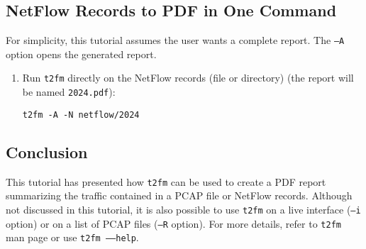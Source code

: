 \documentclass[documentation]{subfiles}
\begin{document}
\subsection{NetFlow Records to PDF in One Command}

For simplicity, this tutorial assumes the user wants a complete report.
The {\tt --A} option opens the generated report.

\begin{enumerate}
    \item Run {\tt t2fm} directly on the NetFlow records (file or directory) (the report will be named {\tt 2024.pdf}):
        \begin{center}
            {\tt t2fm -A -N netflow/2024}
        \end{center}
\end{enumerate}

\subsection{Conclusion}
This tutorial has presented how {\tt t2fm} can be used to create a PDF report summarizing the traffic contained in a PCAP file or NetFlow records. Although not discussed in this tutorial, it is also possible to use {\tt t2fm} on a live interface ({\tt --i} option) or on a list of PCAP files ({\tt --R} option). For more details, refer to {\tt t2fm} man page or use {\tt t2fm --{}--help}.
\end{document}
